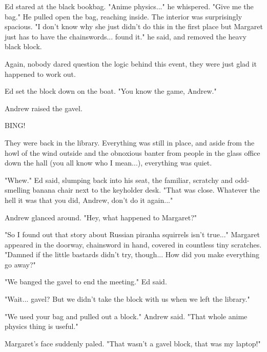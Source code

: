 \documentclass[10pt]{article}
\begin{document}
Ed stared at the black bookbag. "Anime physics..." he whispered. "Give me the bag." He pulled open the bag, reaching inside. The interior was surprisingly spacious. "I don't know why she just didn't do this in the first place but Margaret just has to have the chainswords... found it." he said, and removed the heavy black block.

Again, nobody dared question the logic behind this event, they were just glad it happened to work out.

Ed set the block down on the boat. "You know the game, Andrew."

Andrew raised the gavel.

BING!

They were back in the library. Everything was still in place, and aside from the howl of the wind outside and the obnoxious banter from people in the glass office down the hall (you all know who I mean...), everything was quiet.

"Whew." Ed said, slumping back into his seat, the familiar, scratchy and odd-smelling banana chair next to the keyholder desk. "That was close. Whatever the hell it was that you did, Andrew, don't do it again..."

Andrew glanced around. "Hey, what happened to Margaret?"

"So I found out that story about Russian piranha squirrels isn't true..." Margaret appeared in the doorway, chainsword in hand, covered in countless tiny scratches. "Damned if the little bastards didn't try, though... How did you make everything go away?"

"We banged the gavel to end the meeting." Ed said.

"Wait... gavel? But we didn't take the block with us when we left the library."

"We used your bag and pulled out a block." Andrew said. "That whole anime physics thing is useful."

Margaret's face suddenly paled. "That wasn't a gavel block, that was my laptop!"
\end{document}
